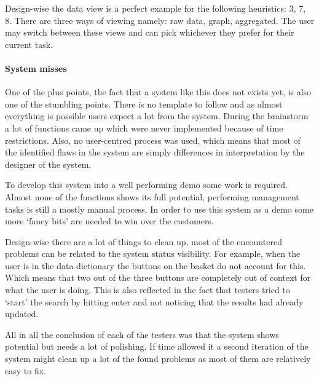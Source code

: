 Design-wise the data view is a perfect example for the following heuristics: 3, 7, 8.
There are three ways of viewing namely: raw data, graph, aggregated.
The user may switch between these views and can pick whichever they prefer for their current task.

\paragraph{System misses}
One of the plus points, the fact that a system like this does not exists yet, is also one of the stumbling points.
There is no template to follow and as almost everything is possible users expect a lot from the system.
During the brainstorm a lot of functions came up which were never implemented because of time restrictions.
Also, no user-centred process was used, which means that most of the identified flaws in the system are simply differences in interpretation by the designer of the system.

To develop this system into a well performing demo some work is required.
Almost none of the functions shows its full potential, performing management tasks is still a mostly manual process.
In order to use this system as a demo some more `fancy bits' are needed to win over the customers.

Design-wise there are a lot of things to clean up, most of the encountered problems can be related to the system status visibility.
For example, when the user is in the data dictionary the buttons on the basket do not account for this.
Which means that two out of the three buttons are completely out of context for what the user is doing.
This is also reflected in the fact that testers tried to `start' the search by hitting enter and not noticing that the results had already updated.

All in all the conclusion of each of the testers was that the system shows potential but needs a lot of polishing.
If time allowed it a second iteration of the system might clean up a lot of the found problems as most of them are relatively easy to fix.
